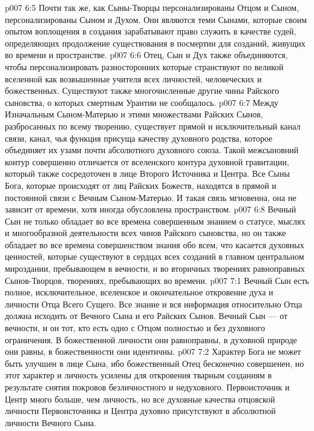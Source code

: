\vs p007 6:5 \pc Почти так же, как Сыны\hyp{}Творцы персонализированы Отцом и Сыном,  персонализированы Сыном и Духом. Они являются теми Сынами, которые своим опытом воплощения в создания зарабатывают право служить в качестве судей, определяющих продолжение существования в посмертии для созданий, живущих во времени и пространстве.
\vs p007 6:6 \pc Отец, Сын и Дух также объединяются, чтобы персонализировать разносторонних  которые странствуют по великой вселенной как возвышенные учителя всех личностей, человеческих и божественных. Существуют также многочисленные другие чины Райского сыновства, о которых смертным Урантии не сообщалось.
\vs p007 6:7 \pc Между Изначальным Сыном\hyp{}Матерью и этими множествами Райских Сынов, разбросанных по всему творению, существует прямой и исключительный канал связи, канал, чья функция присуща качеству духовного родства, которое объединяет их узами почти абсолютного духовного союза. Такой межсыновний контур совершенно отличается от вселенского контура духовной гравитации, который также сосредоточен в лице Второго Источника и Центра. Все Сыны Бога, которые происходят от лиц Райских Божеств, находятся в прямой и постоянной связи с Вечным Сыном\hyp{}Матерью. И такая связь мгновенна, она не зависит от времени, хотя иногда обусловлена пространством.
\vs p007 6:8 Вечный Сын не только обладает во все времена совершенным знанием о статусе, мыслях и многообразной деятельности всех чинов Райского сыновства, но он также обладает во все времена совершенством знания обо всем, что касается духовных ценностей, которые существуют в сердцах всех созданий в главном центральном мироздании, пребывающем в вечности, и во вторичных творениях равноправных Сынов\hyp{}Творцов, творениях, пребывающих во времени.
\vs p007 7:1 Вечный Сын есть полное, исключительное, вселенское и окончательное откровение духа и личности Отца Всего Сущего. Все знание и вся информация относительно Отца должна исходить от Вечного Сына и его Райских Сынов. Вечный Сын --- от вечности, и он тот, кто есть одно с Отцом полностью и без духовного ограничения. В божественной личности они равноправны, в духовной природе они равны, в божественности они идентичны.
\vs p007 7:2 Характер Бога не может быть улучшен в лице Сына, ибо божественный Отец бесконечно совершенен, но этот характер и личность усилены для откровения тварным созданиям в результате снятия покровов безличностного и недуховного. Первоисточник и Центр много больше, чем личность, но все духовные качества отцовской личности Первоисточника и Центра духовно присутствуют в абсолютной личности Вечного Сына.

